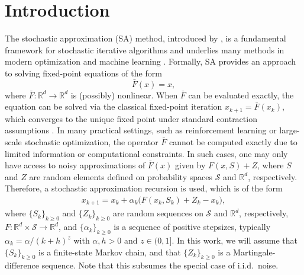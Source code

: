 \documentclass{article}
\begin{document}
\section{Introduction}\label{sec:intro}
The stochastic approximation (SA) method, introduced by \citet{robbins1951stochastic}, is a fundamental framework for stochastic iterative algorithms and underlies many methods in modern optimization and machine learning \citep{kober2013reinforcement,silver2017mastering,jumper2021highly,ouyang2022training}. Formally, SA provides an approach to solving fixed-point equations of the form
\[
\bar{F}(x) = x,
\]
where $\bar{F}:\mathbb{R}^d \to \mathbb{R}^d$ is (possibly) nonlinear. When $\bar{F}$ can be evaluated exactly, the equation can be solved via the classical fixed-point iteration $x_{k+1} = \bar{F}(x_k)$, which converges to the unique fixed point under standard contraction assumptions \citep{banach1922operations}. %
{In many practical settings, such as reinforcement learning or large-scale stochastic optimization, the operator $\bar{F}$ cannot be computed exactly due to limited information or computational constraints. In such cases, one may only have access to noisy approximations of $\bar{F}(x)$ given by $F(x,S) + Z$, where $S$ and $Z$ are random elements defined on probability spaces $\mathcal{S}$ and $\mathbb{R}^d$, respectively.  Therefore, a stochastic approximation recursion is used, which is of the form
\begin{align}\label{eq:stochastic-approximation}
x_{k+1} = x_k + \alpha_k \big(F(x_k, S_k) + Z_k - x_k\big),
\end{align}
where $\{S_k\}_{k\geq 0}$ and $\{Z_k\}_{k\ge 0}$ are random sequences on $\mathcal{S}$ and $\mathbb{R}^d$, respectively, $F:\mathbb{R}^d\times \mathcal{S}\to \mathbb{R}^d$, and $\{\alpha_k\}_{k\geq 0}$ is a sequence of positive stepsizes, typically $\alpha_k = \alpha/(k+h)^z$ with $\alpha,h>0$ and $z\in(0,1]$. In this work, we will assume that %
$\{S_k\}_{k\geq 0}$ is a finite-state Markov chain, and that $\{Z_k\}_{k\ge 0}$ is a Martingale-difference sequence. Note that this subsumes the special case of i.i.d.\ noise.}
\end{document}
